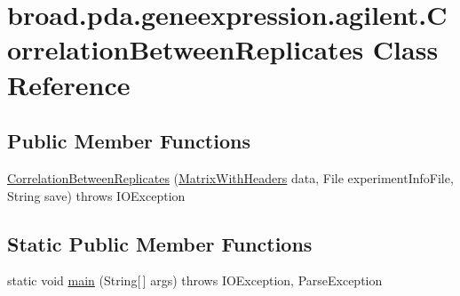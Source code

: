 \hypertarget{classbroad_1_1pda_1_1geneexpression_1_1agilent_1_1_correlation_between_replicates}{\section{broad.\+pda.\+geneexpression.\+agilent.\+Correlation\+Between\+Replicates Class Reference}
\label{classbroad_1_1pda_1_1geneexpression_1_1agilent_1_1_correlation_between_replicates}
}
\subsection*{Public Member Functions}
\begin{DoxyCompactItemize}
\item 
\hyperlink{classbroad_1_1pda_1_1geneexpression_1_1agilent_1_1_correlation_between_replicates_a2e355029abd1c0c68775a74ca66caeab}{Correlation\+Between\+Replicates} (\hyperlink{classbroad_1_1core_1_1datastructures_1_1_matrix_with_headers}{Matrix\+With\+Headers} data, File experiment\+Info\+File, String save)  throws I\+O\+Exception
\end{DoxyCompactItemize}
\subsection*{Static Public Member Functions}
\begin{DoxyCompactItemize}
\item 
static void \hyperlink{classbroad_1_1pda_1_1geneexpression_1_1agilent_1_1_correlation_between_replicates_af04fcbd8d6dba821d3fcc2d2a4659d11}{main} (String\mbox{[}$\,$\mbox{]} args)  throws I\+O\+Exception, Parse\+Exception
\end{DoxyCompactItemize}


